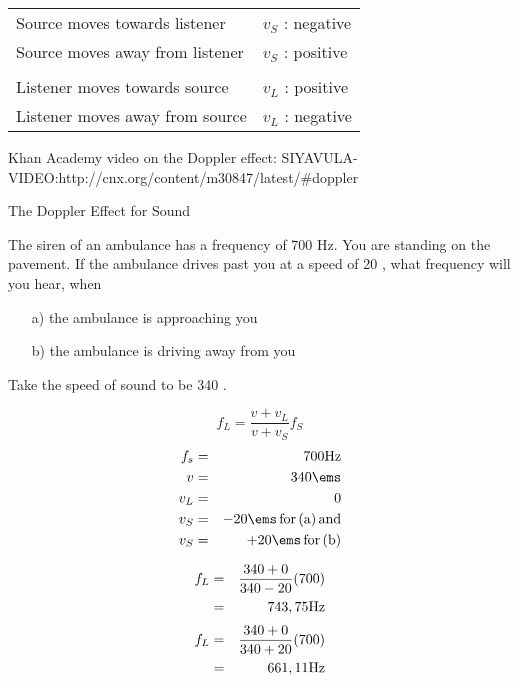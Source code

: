 \begin{center}
\begin{tabular}{|ll|}
\hline
Source moves towards listener & $v_S$ : negative\\
Source moves away from listener & $v_S$ : positive\\
    &   \\
Listener moves towards source & $v_L$ : positive\\
Listener moves away from source & $v_L$ : negative\\
\hline
\end{tabular}
\end{center}
Khan Academy video on the Doppler effect: SIYAVULA-VIDEO:http://cnx.org/content/m30847/latest/#doppler
\begin{wex}{The Doppler Effect for Sound}{
The siren of an ambulance has a frequency of 700 Hz. You are standing on the pavement. If the ambulance drives past you at a speed of 20 \ms, what frequency will you hear, when
\begin{enumerate}
\item[a)] the ambulance is approaching you 
\item[b)] the ambulance is driving away from you
\end{enumerate}
Take the speed of sound to be 340 \ms.
}
{
$$f_L=\frac{v + v_L}{v + v_S}f_S$$
\begin{eqnarray*}
f_s&=&700 \rm{Hz}\\
v&=&340\ems\\
v_L&=&0\\
v_S&=&-20\ems \rm{\, for\, (a)\, and}\\
v_S&=&+20\ems \rm{\, for\, (b)}
\end{eqnarray*}

\begin{eqnarray*}
f_L&=&\frac{340+0}{340-20}(700)\\
&=&743,75 \rm{Hz}
\end{eqnarray*}
\begin{eqnarray*}
f_L&=&\frac{340+0}{340+20}(700)\\
&=&661,11 \rm{Hz}
\end{eqnarray*}
}
\end{wex}


